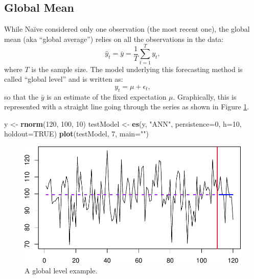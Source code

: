 \documentclass[]{book}
\newenvironment{Shaded}{\begin{snugshade}}{\end{snugshade}}
\newcommand{\DataTypeTok}[1]{\textcolor[rgb]{0.13,0.29,0.53}{#1}}
\newcommand{\DecValTok}[1]{\textcolor[rgb]{0.00,0.00,0.81}{#1}}
\newcommand{\KeywordTok}[1]{\textcolor[rgb]{0.13,0.29,0.53}{\textbf{#1}}}
\newcommand{\NormalTok}[1]{#1}
\newcommand{\OtherTok}[1]{\textcolor[rgb]{0.56,0.35,0.01}{#1}}
\newcommand{\StringTok}[1]{\textcolor[rgb]{0.31,0.60,0.02}{#1}}
\theoremstyle{definition}
\theoremstyle{definition}
\theoremstyle{definition}
\theoremstyle{definition}
\theoremstyle{remark}
\begin{document}
\hypertarget{GlobalMean}{%
\subsection{Global Mean}\label{GlobalMean}}

While Naïve considered only one observation (the most recent one), the global mean (aka ``global average'') relies on all the observations in the data:
\begin{equation}
    \hat{y}_t = \bar{y} = \frac{1}{T} \sum_{t=1}^T y_{t} ,
    \label{eq:GlobalMean}
\end{equation}
where \(T\) is the sample size. The model underlying this forecasting method is called ``global level'' and is written as:
\begin{equation}
    y_t = \mu + \epsilon_t,
    \label{eq:GlobalLevel}
\end{equation}
so that the \(\bar{y}\) is an estimate of the fixed expectation \(\mu\). Graphically, this is represented with a straight line going through the series as shown in Figure \ref{fig:globalMeanExample}.

\begin{Shaded}
\begin{Highlighting}[]
\NormalTok{y <-}\StringTok{ }\KeywordTok{rnorm}\NormalTok{(}\DecValTok{120}\NormalTok{, }\DecValTok{100}\NormalTok{, }\DecValTok{10}\NormalTok{)}
\NormalTok{testModel <-}\StringTok{ }\KeywordTok{es}\NormalTok{(y, }\StringTok{"ANN"}\NormalTok{, }\DataTypeTok{persistence=}\DecValTok{0}\NormalTok{,}
                 \DataTypeTok{h=}\DecValTok{10}\NormalTok{, }\DataTypeTok{holdout=}\OtherTok{TRUE}\NormalTok{)}
\KeywordTok{plot}\NormalTok{(testModel, }\DecValTok{7}\NormalTok{, }\DataTypeTok{main=}\StringTok{""}\NormalTok{)}
\end{Highlighting}
\end{Shaded}

\begin{figure}
\centering
\includegraphics{Svetunkov--2022----ADAM_files/figure-latex/globalMeanExample-1.pdf}
\caption{\label{fig:globalMeanExample}A global level example.}
\end{figure}
\end{document}
